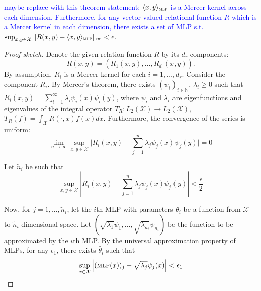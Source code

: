 \textcolor{blue}{maybe replace with this theorem statement: $\langle x, y \rangle_{\text{\sc mlp}}$ is a Mercer kernel across each dimension. Furthermore, for any vector-valued relational function $R$ which is a Mercer kernel in each dimension, there exists a set of MLP s.t. $\sup_{x,y \in \mathcal{X}}{\lVert R(x,y) - \langle x, y \rangle_{\text{\sc mlp}} \rVert_\infty} < \epsilon$}.

\begin{proof}[Proof sketch]
	\hphantom{~}

	Denote the given relation function $R$ by its $d_r$ components: 
	\begin{equation}
		R(x,y) = (R_1(x,y), ..., R_{d_r}(x,y)). 
	\end{equation}
	By assumption, $R_i$ is a Mercer kernel for each $i = 1, ..., d_r$. Consider the component $R_i$. By Mercer's theorem, there exists $(\psi_i)_{i \in \mathbb{N}}$, $\lambda_i \geq 0$ such that $R_i(x,y) = \sum_{i=1}^{\infty}{\lambda_i \psi_i(x) \psi_i(y)}$, where $\psi_i$ and $\lambda_i$ are eigenfunctions and eigenvalues of the integral operator $T_R: L_2(\mathcal{X}) \to L_2(\mathcal{X})$, $T_R(f) = \int_{\mathcal{X}}{R(\cdot, x) f(x) dx}$. Furthermore, the convergence of the series is uniform:
	\begin{equation}
		\lim_{n \to \infty} \sup_{x,y \in \mathcal{X}} \lvert R_i(x,y) - \sum_{j=1}^{n}{\lambda_j \psi_j(x) \psi_j(y) \rvert} = 0
	\end{equation}

	Let $\tilde{n}_i$ be such that
	\begin{equation}
		\label{eq:proof_mercer_thm_unif_abs_cv}
		\sup_{x,y \in \mathcal{X}} \left\lvert R_i(x,y) - \sum_{j=1}^{n}{\lambda_j \psi_j(x) \psi_j(y)} \right\rvert < \frac{\epsilon}{2}
	\end{equation}

	Now, for $j = 1, ..., \tilde{n}_i$, let the $i$th MLP with parameters $\theta_i$ be a function from $\mathcal{X}$ to $\tilde{n}_i$-dimensional space. Let $(\sqrt{\lambda_1} \psi_1, ..., \sqrt{\lambda_{\tilde{n}_i}} \psi_{\tilde{n}_i})$ be the function to be approximated by the $i$th MLP. By the universal approximation property of MLPs, for any $\epsilon_1$, there exists $\hat{\theta}_i$ such that
	\begin{equation}
		\label{eq:proof_MLP_UAP}
		\sup_{x\in \mathcal{X}}{\left\lvert (\MLP(x))_j - \sqrt{\lambda_j} \psi_j(x) \right\lvert } < \epsilon_1
	\end{equation}


\end{proof}
